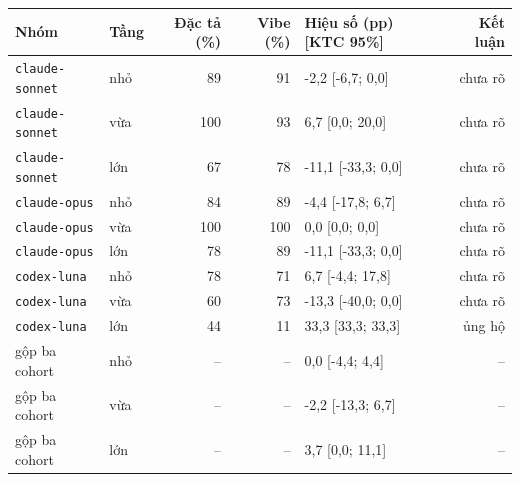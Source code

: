 \begin{tabular}{llrrlr}
\toprule
Nhóm & Tầng & Đặc tả (\%) & Vibe (\%) & Hiệu số (pp) [KTC 95\%] & Kết luận \\
\midrule
\texttt{claude-sonnet} & nhỏ & 89 & 91 & -2,2 [-6,7; 0,0] & chưa rõ \\
\texttt{claude-sonnet} & vừa & 100 & 93 & 6,7 [0,0; 20,0] & chưa rõ \\
\texttt{claude-sonnet} & lớn & 67 & 78 & -11,1 [-33,3; 0,0] & chưa rõ \\
\texttt{claude-opus} & nhỏ & 84 & 89 & -4,4 [-17,8; 6,7] & chưa rõ \\
\texttt{claude-opus} & vừa & 100 & 100 & 0,0 [0,0; 0,0] & chưa rõ \\
\texttt{claude-opus} & lớn & 78 & 89 & -11,1 [-33,3; 0,0] & chưa rõ \\
\texttt{codex-luna} & nhỏ & 78 & 71 & 6,7 [-4,4; 17,8] & chưa rõ \\
\texttt{codex-luna} & vừa & 60 & 73 & -13,3 [-40,0; 0,0] & chưa rõ \\
\texttt{codex-luna} & lớn & 44 & 11 & 33,3 [33,3; 33,3] & ủng hộ \\
gộp ba cohort & nhỏ & – & – & 0,0 [-4,4; 4,4] & – \\
gộp ba cohort & vừa & – & – & -2,2 [-13,3; 6,7] & – \\
gộp ba cohort & lớn & – & – & 3,7 [0,0; 11,1] & – \\
\bottomrule
\end{tabular}
